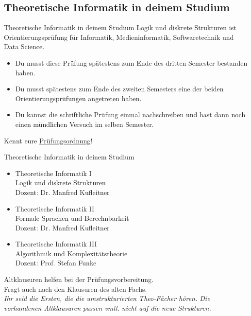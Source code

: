 \subsection{Theoretische Informatik in deinem Studium}
\begin{frame}[fragile]{Theoretische Informatik in deinem Studium}
    Logik und diskrete Strukturen ist Orientierungsprüfung für Informatik, Medieninformatik, Softwaretechnik und Data Science.
    \begin{itemize}
        \item Du musst diese Prüfung spätestens zum Ende des dritten Semester bestanden haben.
        \item Du musst spätestens zum Ende des zweiten Semesters eine der beiden Orientierungsprüfungen angetreten haben.
        \item Du kannst die schriftliche Prüfung einmal nachschreiben und hast dann noch einen mündlichen Versuch im selben Semester.
    \end{itemize}
    \alert{Kennt eure \href{https://www.student.uni-stuttgart.de/pruefungsorganisation/pruefungsordnung/}{\underline{Prüfungsordnung}}!}
\end{frame}

\begin{frame}{Theoretische Informatik in deinem Studium}
    \begin{itemize}
        \item Theoretische Informatik I\\
              Logik und diskrete Strukturen\\
              \quad Dozent: Dr. Manfred Kufleitner
        \item Theoretische Informatik II\\
              Formale Sprachen und Berechnbarkeit\\
              \quad Dozent: Dr. Manfred Kufleitner
        \item Theoretische Informatik III\\
              Algorithmik und Komplexitätstheorie\\
              \quad Dozent: Prof. Stefan Funke
    \end{itemize}
    \alert{Altklausuren helfen bei der Prüfungsvorbereitung. \\Fragt auch nach den Klausuren des alten Fachs.}\\
    \textit{Ihr seid die Ersten, die die umstrukturierten Theo-Fächer hören. Die vorhandenen Altklausuren passen vmtl. nicht auf die neue Strukturen.}
\end{frame}

